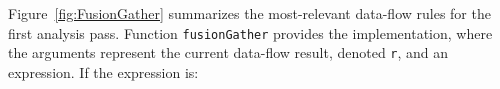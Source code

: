 \documentclass{sigplanconf}  %
\newcommand{\emp}[1]{\textcolor{DikuRed}{ #1}}
\newcommand{\emphh}[1]{\textcolor{CosGreen}{ #1}}
\begin{document}

%

Figure~\ref{fig:FusionGather} summarizes the most-relevant data-flow rules
for the first analysis pass. Function {\tt fusionGather} provides the implementation,
where the arguments represent the current data-flow result, denoted {\tt r}, and an 
expression.   If the expression is:
\end{document}
